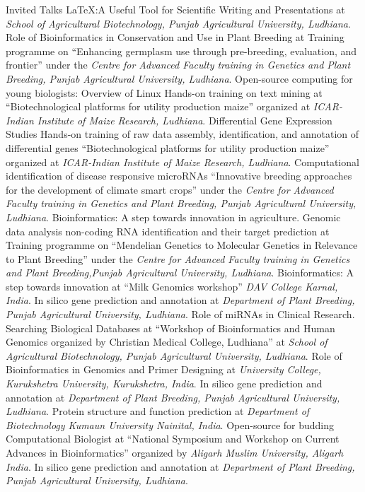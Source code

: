 \begin{rubric}{Invited Talks}
\entryb[November 22, 2017] LaTeX:\@ A Useful Tool for Scientific Writing and Presentations at \textit{School of Agricultural Biotechnology, Punjab Agricultural University, Ludhiana}. 
\entryb[November 1, 2017] Role of Bioinformatics in Conservation and Use in Plant Breeding at Training programme on ``Enhancing germplasm use through pre-breeding, evaluation, and frontier'' under the \textit{Centre for Advanced Faculty training in Genetics and Plant Breeding, Punjab Agricultural University, Ludhiana}.
\entryb[February 3, 2017] Open-source computing for young biologists: Overview of Linux Hands-on training on text mining at ``Biotechnological platforms for utility production maize'' organized at \textit{ICAR-Indian Institute of Maize Research, Ludhiana}.
\entryb[February 6, 2017] Differential Gene Expression Studies Hands-on training of raw data assembly, identification, and annotation of differential genes ``Biotechnological platforms for utility production maize'' organized at \textit{ICAR-Indian Institute of Maize Research, Ludhiana}.
\entryb[August 30, 2016] Computational identification of disease responsive microRNAs ``Innovative breeding approaches for the development of climate smart crops'' under the  \textit{Centre for Advanced Faculty training in Genetics and Plant Breeding, Punjab Agricultural University, Ludhiana}.
\entryb[August 6-{}26, 2015] Bioinformatics: A step towards innovation in agriculture.
\entryb[August 6-{}26, 2015]Genomic data analysis non-coding RNA identification and their target prediction at Training programme on ``Mendelian Genetics to Molecular Genetics in Relevance to Plant Breeding'' under the \textit{Centre for Advanced Faculty training in Genetics and Plant Breeding,Punjab Agricultural University, Ludhiana}. 
\entryb[August 23, 2014] Bioinformatics: A step towards innovation at ``Milk Genomics workshop'' \textit{DAV College Karnal, India}. 
\entryb[August 18, 2014] In silico gene prediction and annotation at \textit{Department of Plant Breeding, Punjab Agricultural University, Ludhiana}.
\entryb[November 13, 2013] Role of miRNAs in Clinical Research.
\entryb[November 13, 2013] Searching Biological Databases at ``Workshop of Bioinformatics and Human Genomics organized by Christian Medical College, Ludhiana'' at \textit{School of Agricultural Biotechnology, Punjab Agricultural University, Ludhiana}. 
\entryb[October 23, 2013] Role of Bioinformatics in Genomics and Primer Designing at \textit{University College, Kurukshetra University, Kurukshetra, India}.
\entryb[September 27, 2013] In silico gene prediction and annotation at \textit{Department of Plant Breeding, Punjab Agricultural University, Ludhiana}.
\entryb[March 15, 2013] Protein structure and function prediction at \textit{Department of Biotechnology Kumaun University Nainital, India}.
\entryb[March 13-{}14, 2013] Open-source for budding Computational Biologist at ``National Symposium and Workshop on Current Advances in Bioinformatics'' organized by \textit{Aligarh Muslim University, Aligarh India}.
\entryb[March 12, 2013] In silico gene prediction and annotation at \textit{Department of Plant Breeding, Punjab Agricultural University, Ludhiana}.
\end{rubric}